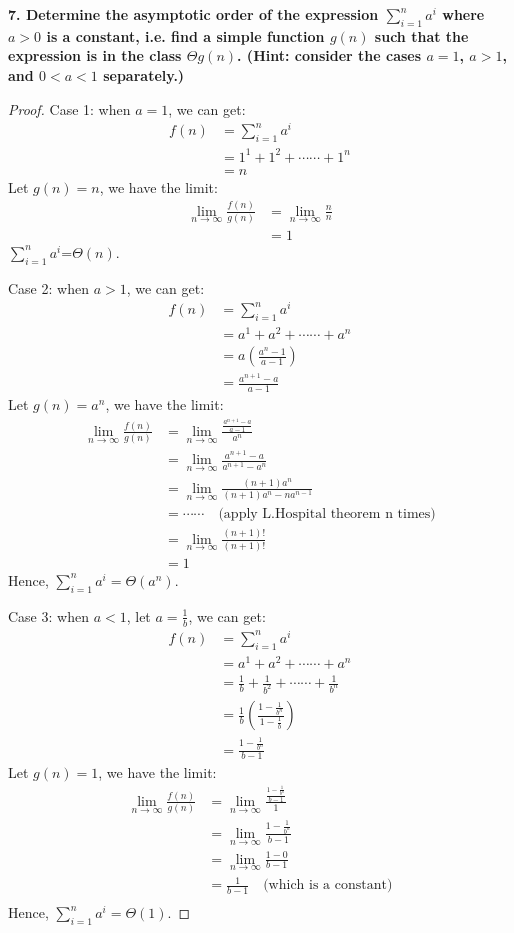 \documentclass[12pt]{article}
\begin{document}
\noindent \textbf{7. Determine the asymptotic order of the expression $\sum_{i=1}^{n}a^i$ where $a > 0$ is a constant, i.e. find a simple function $g(n)$ such that the expression is in the class $\Theta g(n)$. (Hint: consider the cases $a=1$, $a>1$, and $0<a<1$ separately.)}
\begin{proof}
	Case 1: when $a=1$, we can get:
	\begin{align*}
		f(n)&=\sum_{i=1}^{n}a^i\\
		&=1^1+1^2+\cdots\cdots+1^n\\
		&=n
	\end{align*}
Let $g(n)=n$, we have the limit:
\begin{align*}
	\lim\limits_{n\to\infty}\frac{f(n)}{g(n)}&=	\lim\limits_{n\to\infty}\frac{n}{n}\\
	&=1
\end{align*}
$\sum_{i=1}^{n}a^i$=$\Theta(n)$.

Case 2: when $a>1$, we can get:
	\begin{align*}
	f(n)&=\sum_{i=1}^{n}a^i\\
	&=a^1+a^2+\cdots\cdots+a^n\\
	&=a(\frac{a^n-1}{a-1})\\
	&=\frac{a^{n+1}-a}{a-1}
	\end{align*}
Let $g(n)=a^n$, we have the limit:
\begin{align*}
	\lim\limits_{n\to\infty}\frac{f(n)}{g(n)}&=	\lim\limits_{n\to\infty}\frac{\frac{a^{n+1}-a}{a-1}}{a^n}\\
	&=	\lim\limits_{n\to\infty}\frac{a^{n+1}-a}{a^{n+1}-a^n}\\
	&=	\lim\limits_{n\to\infty}\frac{(n+1)a^{n}}{(n+1)a^{n}-na^{n-1}}\\
	&=\cdots\cdots \quad\text{(apply L.Hospital theorem n times)}\\
	&=	\lim\limits_{n\to\infty}\frac{(n+1)!}{(n+1)!}\\
	&=1
\end{align*}
	Hence, $\sum_{i=1}^{n}a^i = \Theta (a^n)$.

Case 3: when $a<1$, let $a=\frac{1}{b}$, we can get:
	\begin{align*}
		f(n)&=\sum_{i=1}^{n}a^i\\
		&=a^1+a^2+\cdots\cdots+a^n\\
		&=\frac{1}{b}+\frac{1}{b^2}+\cdots\cdots+\frac{1}{b^n}\\
		&=\frac{1}{b}(\frac{1-\frac{1}{b^n}}{1-\frac{1}{b}})\\
		&=\frac{1-\frac{1}{b^n}}{b-1}
	\end{align*}
Let $g(n)=1$, we have the limit:
\begin{align*}
	\lim\limits_{n\to\infty}\frac{f(n)}{g(n)}&=	\lim\limits_{n\to\infty}\frac{\frac{1-\frac{1}{b^n}}{b-1}}{1}\\
	&=	\lim\limits_{n\to\infty}\frac{1-\frac{1}{b^n}}{b-1}\\
	&=	\lim\limits_{n\to\infty}\frac{1-0}{b-1}\\
	&=\frac{1}{b-1} \quad\text{(which is a constant)}\\ 
\end{align*}
Hence, $\sum_{i=1}^{n}a^i = \Theta (1)$.
\end{proof}
\end{document}
